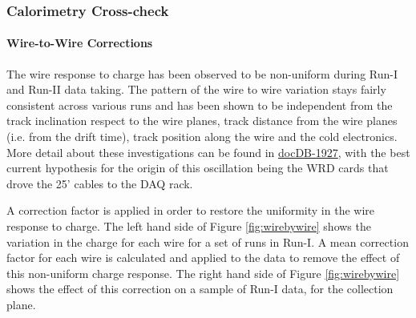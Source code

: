 \subsubsection{Calorimetry Cross-check} \label{sec:calocrosscheck}
\paragraph{\textbf{Wire-to-Wire Corrections}}

The wire response to charge has been observed to be non-uniform during Run-I and Run-II data taking. The pattern of the wire to wire variation stays fairly consistent across various runs and has been shown to be independent from the track inclination respect to the wire planes, track distance from the wire planes (i.e. from the drift time), track position along the wire and the cold electronics. More detail about these investigations can be found in \href{https://lartpc-docdb.fnal.gov:441/cgi-bin/ShowDocument?docid=1927}{docDB-1927}, with the best current hypothesis for the origin of this oscillation being the WRD cards that drove the 25' cables to the DAQ rack.


A correction factor is applied in order to restore the uniformity in the wire response to charge. The left hand side of Figure \ref{fig:wirebywire} shows the variation in the charge for each wire for a set of runs in Run-I. A mean correction factor for each wire is calculated and applied to the data to remove the effect of this non-uniform charge response. The right hand side of Figure \ref{fig:wirebywire} shows the effect of this correction on a sample of Run-I data, for the collection plane.

